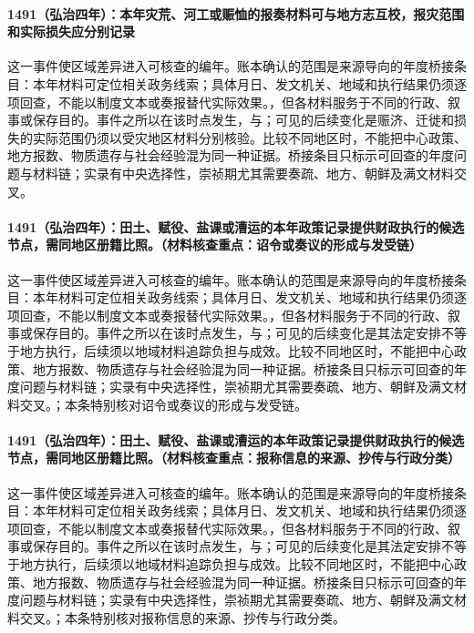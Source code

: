 \paragraph{1491（弘治四年）：本年灾荒、河工或赈恤的报奏材料可与地方志互校，报灾范围和实际损失应分别记录} 这一事件使区域差异进入可核查的编年。账本确认的范围是来源导向的年度桥接条目：本年材料可定位相关政务线索；具体月日、发文机关、地域和执行结果仍须逐项回查，不能以制度文本或奏报替代实际效果。，但各材料服务于不同的行政、叙事或保存目的。事件之所以在该时点发生，与；可见的后续变化是赈济、迁徙和损失的实际范围仍须以受灾地区材料分别核验。比较不同地区时，不能把中心政策、地方报数、物质遗存与社会经验混为同一种证据。桥接条目只标示可回查的年度问题与材料链；实录有中央选择性，崇祯期尤其需要奏疏、地方、朝鲜及满文材料交叉。

\paragraph{1491（弘治四年）：田土、赋役、盐课或漕运的本年政策记录提供财政执行的候选节点，需同地区册籍比照。（材料核查重点：诏令或奏议的形成与发受链）} 这一事件使区域差异进入可核查的编年。账本确认的范围是来源导向的年度桥接条目：本年材料可定位相关政务线索；具体月日、发文机关、地域和执行结果仍须逐项回查，不能以制度文本或奏报替代实际效果。，但各材料服务于不同的行政、叙事或保存目的。事件之所以在该时点发生，与；可见的后续变化是其法定安排不等于地方执行，后续须以地域材料追踪负担与成效。比较不同地区时，不能把中心政策、地方报数、物质遗存与社会经验混为同一种证据。桥接条目只标示可回查的年度问题与材料链；实录有中央选择性，崇祯期尤其需要奏疏、地方、朝鲜及满文材料交叉。；本条特别核对诏令或奏议的形成与发受链。

\paragraph{1491（弘治四年）：田土、赋役、盐课或漕运的本年政策记录提供财政执行的候选节点，需同地区册籍比照。（材料核查重点：报称信息的来源、抄传与行政分类）} 这一事件使区域差异进入可核查的编年。账本确认的范围是来源导向的年度桥接条目：本年材料可定位相关政务线索；具体月日、发文机关、地域和执行结果仍须逐项回查，不能以制度文本或奏报替代实际效果。，但各材料服务于不同的行政、叙事或保存目的。事件之所以在该时点发生，与；可见的后续变化是其法定安排不等于地方执行，后续须以地域材料追踪负担与成效。比较不同地区时，不能把中心政策、地方报数、物质遗存与社会经验混为同一种证据。桥接条目只标示可回查的年度问题与材料链；实录有中央选择性，崇祯期尤其需要奏疏、地方、朝鲜及满文材料交叉。；本条特别核对报称信息的来源、抄传与行政分类。

